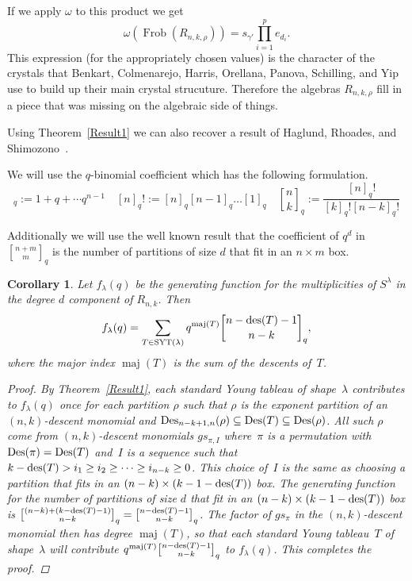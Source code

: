 \documentclass[10pt]{article}
\newcommand{\coloneqq}{:=}
\newcommand{\Frob}{\operatorname{Frob}}\newcommand{\gr}{\operatorname{gr}}
\newcommand{\maj}{\operatorname{maj}}\newcommand{\shape}{\operatorname{shape}}\newcommand{\sh}{\operatorname{sh}}
\newtheorem{coro}[thm]{Corollary}
\begin{document}
If we apply $\omega$ to this product we get 
\begin{equation}
\omega(\Frob (R_{n,k,\rho}))=s_{\gamma'} \prod_{i=1}^p 
e_{d_i}.
\end{equation}
 This expression (for the appropriately chosen values) is the character of the crystals that Benkart, 
Colmenarejo, Harris, Orellana, Panova, Schilling, and Yip~\cite{Sh} use to build up their main crystal strucuture. Therefore 
the algebras $R_{n,k,\rho}$ fill in a piece that was missing on the algebraic side of things.



Using Theorem~\ref{Result1} we can also recover a result of Haglund, Rhoades, and Shimozono~\cite{HRS}.

We will use the $q$-binomial coefficient which has the following formulation.
\begin{equation}
[n]_q\coloneqq 1+q+\cdots q^{n-1}\quad [n]_q!\coloneqq [n]_q[n-1]_q\ldots [1]_q\quad 
\genfrac{[}{]}{0pt}{}{n}{k}_q\coloneqq \frac{[n]_q!}{[k]_q![n-k]_q!}
\end{equation}

Additionally we will use the well known result that the coefficient of $q^d$ in $\genfrac{[}{]}{0pt}{}{n+m}{m}_q$ is the number 
of partitions of size $d$ that fit in an $n\times m$ box.


\begin{coro}
	Let $f_\lambda(q)$ be the generating function for the multiplicities of $S^{\lambda}$ in the degree $d$ component of 
$R_{n,k}$. Then
\begin{equation}
f_\lambda(q)=\sum_{T\in \SYT (\lambda)} 
q^{\maj(T)}\genfrac{[}{]}{0pt}{}{n-\des (T)-1}{n-k}_q,
\end{equation}
 where the major index $\maj(T)$ is the sum of the descents 
of~$T$.
	\begin{proof}

		By Theorem~\ref{Result1}, each standard Young tableau of shape~$\lambda$ contributes to $f_\lambda(q)$ once for each 
partition $\rho$ such that $\rho$ is the exponent partition of an $(n,k)$-descent monomial and 
$\operatorname{Des} _{n-k+1,n}(\rho)\subseteq \operatorname{Des} (T)\subseteq \operatorname{Des} (\rho)$. All such $\rho$ come from $(n,k)$-descent monomials 
$gs_{\pi,I}$ where~$\pi$ is a permutation with $\operatorname{Des} (\pi)=\operatorname{Des} (T)$ and~$I$ is a sequence such that $k-\operatorname{des} (T)>i_1\geq 
i_2\geq\cdots\geq i_{n-k}\geq 0$. This choice of~$I$ is the same as choosing a partition that fits in an $(n-k)\times 
(k-1-\operatorname{des} (T))$ box. The generating function for the number of partitions of size $d$ that fit in an $(n-k)\times 
(k-1-\operatorname{des} (T))$ box is $\genfrac{[}{]}{0pt}{}{(n-k)+(k-\des (T)-1)}{n-k}_q=\genfrac{[}{]}{0pt}{}{n-\des (T)-1}{n-k}_q$. The 
factor of $gs_\pi$ in the $(n,k)$-descent monomial then has degree $\maj(T)$, so that each standard Young tableau~$T$ 
of shape~$\lambda$ will contribute $q^{\maj(T)}\genfrac{[}{]}{0pt}{}{n-\des (T)-1}{n-k}_q$ to $f_\lambda(q)$. This 
completes the proof.
	\end{proof}
\end{coro}
\end{document}
